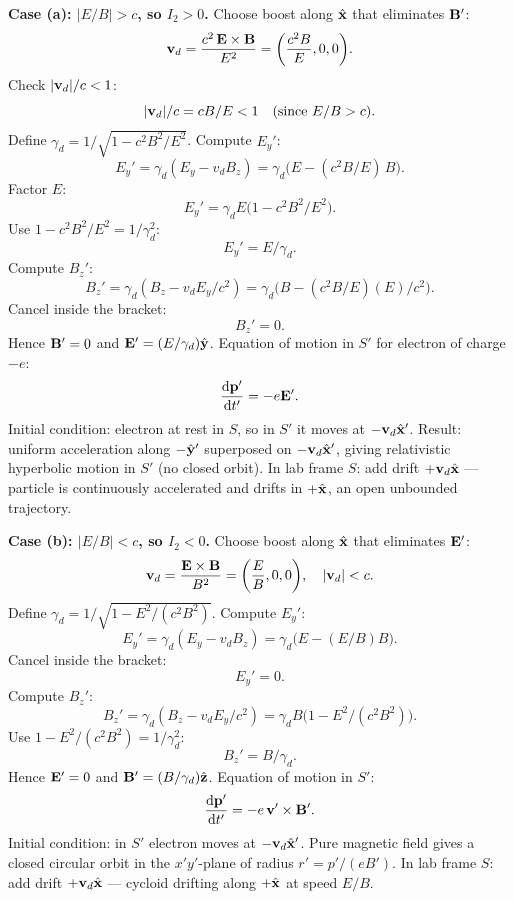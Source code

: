 \documentclass[11pt]{article}
\begin{document}
\textbf{Case (a): $|E/B|>c$, so $I_2 > 0$.} Choose boost along $\hat{\vb x}$ that eliminates $\vb B'$:
\[
\vb v_d = \frac{c^2\,\vb E\times\vb B}{E^2} = \biggl(\frac{c^2 B}{E},0,0\biggr).
\]
Check $|\vb v_d|/c < 1$:
\[
|\vb v_d|/c = cB/E < 1\quad(\text{since }E/B>c).
\]
Define $\gamma_d = 1/\sqrt{1-c^2 B^2/E^2}$. Compute $E_y'$:
\[
E_y' = \gamma_d(E_y - v_d B_z) = \gamma_d\bigl(E - (c^2 B/E)\,B\bigr).
\]
Factor $E$:
\[
E_y' = \gamma_d E\bigl(1 - c^2 B^2/E^2\bigr).
\]
Use $1 - c^2 B^2/E^2 = 1/\gamma_d^2$:
\[
E_y' = E/\gamma_d.
\]
Compute $B_z'$:
\[
B_z' = \gamma_d(B_z - v_d E_y/c^2) = \gamma_d\bigl(B - (c^2 B/E)(E)/c^2\bigr).
\]
Cancel inside the bracket:
\[
B_z' = 0.
\]
Hence $\vb B'=0$ and $\vb E'=(E/\gamma_d)\hat{\vb y}$. Equation of motion in $S'$ for electron of charge $-e$:
\[
\dv{\vb p'}{t'} = -e\vb E'.
\]
Initial condition: electron at rest in $S$, so in $S'$ it moves at $-\vb v_d\hat{\vb x}'$. Result: uniform acceleration along $-\hat{\vb y}'$ superposed on $-\vb v_d\hat{\vb x}'$, giving relativistic hyperbolic motion in $S'$ (no closed orbit).
In lab frame $S$: add drift $+\vb v_d\hat{\vb x}$ — particle is continuously accelerated and drifts in $+\hat{\vb x}$, an open unbounded trajectory.

\textbf{Case (b): $|E/B|<c$, so $I_2 < 0$.} Choose boost along $\hat{\vb x}$ that eliminates $\vb E'$:
\[
\vb v_d = \frac{\vb E\times\vb B}{B^2} = \biggl(\frac{E}{B},0,0\biggr),\quad|\vb v_d|<c.
\]
Define $\gamma_d = 1/\sqrt{1-E^2/(c^2 B^2)}$. Compute $E_y'$:
\[
E_y' = \gamma_d(E_y - v_d B_z) = \gamma_d\bigl(E - (E/B)B\bigr).
\]
Cancel inside the bracket:
\[
E_y' = 0.
\]
Compute $B_z'$:
\[
B_z' = \gamma_d(B_z - v_d E_y/c^2) = \gamma_d B\bigl(1 - E^2/(c^2 B^2)\bigr).
\]
Use $1 - E^2/(c^2 B^2) = 1/\gamma_d^2$:
\[
B_z' = B/\gamma_d.
\]
Hence $\vb E'=0$ and $\vb B'=(B/\gamma_d)\hat{\vb z}$. Equation of motion in $S'$:
\[
\dv{\vb p'}{t'} = -e\,\vb v'\times\vb B'.
\]
Initial condition: in $S'$ electron moves at $-\vb v_d\hat{\vb x}'$. Pure magnetic field gives a closed circular orbit in the $x'y'$-plane of radius $r' = p'/(eB')$.
In lab frame $S$: add drift $+\vb v_d\hat{\vb x}$ — cycloid drifting along $+\hat{\vb x}$ at speed $E/B$.
\end{document}
